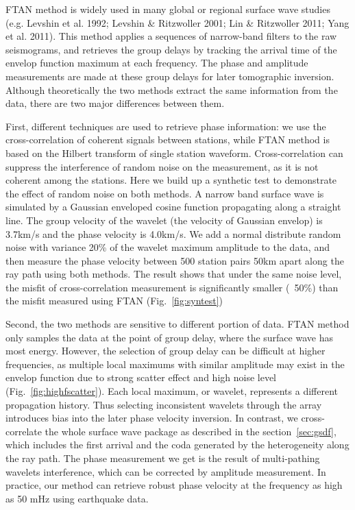 \documentclass{gji}
\begin{document}
FTAN method is widely used in many global or regional surface wave studies (e.g. Levshin et al. 1992; Levshin \& Ritzwoller 2001; Lin \& Ritzwoller 2011; Yang et al. 2011). This method applies a sequences of narrow-band filters to the raw seismograms, and retrieves the group delays by tracking the arrival time of the envelop function maximum at each frequency. The phase and amplitude measurements are made at these group delays for later tomographic inversion. Although theoretically the two methods extract the same information from the data, there are two major differences between them. 

First, different techniques are used to retrieve phase information: we use the cross-correlation of coherent signals between stations, while FTAN method is based on the Hilbert transform of single station waveform. Cross-correlation can suppress the interference of random noise on the measurement, as it is not coherent among the stations. Here we build up a synthetic test to demonstrate the effect of random noise on both methods. A narrow band surface wave is simulated by a Gaussian enveloped cosine function propagating along a straight line. The group velocity of the wavelet (the velocity of Gaussian envelop) is 3.7km/s and the phase velocity is 4.0km/s. We add a normal distribute random noise with variance 20\% of the wavelet maximum amplitude to the data, and then measure the phase velocity between 500 station pairs 50km apart along the ray path using both methods. The result shows that under the same noise level, the misfit of cross-correlation measurement is significantly smaller (~50\%) than the misfit measured using FTAN (Fig.~\ref{fig:syntest})

Second, the two methods are sensitive to different portion of data. FTAN method only samples the data at the point of group delay, where the surface wave has most energy. However, the selection of group delay can be difficult at higher frequencies, as multiple local maximums with similar amplitude may exist in the envelop function due to strong scatter effect and high noise level (Fig.~\ref{fig:highfscatter}). Each local maximum, or wavelet, represents a different propagation history. Thus selecting inconsistent wavelets through the array introduces bias into the later phase velocity inversion. In contrast, we cross-correlate the whole surface wave package as described in the section~\ref{sec:gsdf}, which includes the first arrival and the coda generated by the heterogeneity along the ray path. The phase measurement we get is the result of multi-pathing wavelets interference, which can be corrected by amplitude measurement. In practice, our method can retrieve robust phase velocity at the frequency as high as 50 mHz using earthquake data.
\end{document}
